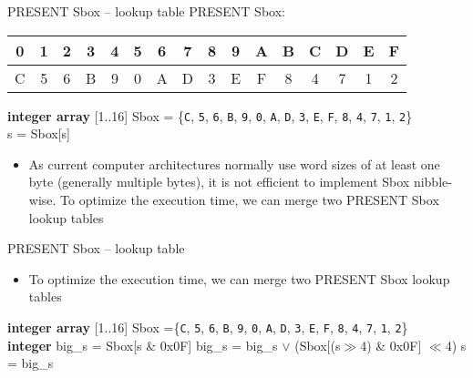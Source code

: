 \begin{frame}{PRESENT Sbox -- lookup table}
PRESENT Sbox:
\begin{table}
\centering
\ttfamily
\begin{tabular}{cccccccccccccccc}\hline
 0 & 1 & 2 & 3 & 4 & 5 & 6 & 7 & 8 & 9 & A & B & C & D & E & F \\\hline
 C & 5 & 6 & B & 9 & 0 & A & D & 3 & E & F & 8 & 4 & 7 & 1 & 2\\\hline
\end{tabular}
\end{table}
\begin{algorithm}[H]
	\textbf{integer array} [1..16] Sbox = \{\texttt{C}, \texttt{5}, \texttt{6}, \texttt{B}, \texttt{9}, \texttt{0}, \texttt{A}, \texttt{D}, \texttt{3}, \texttt{E}, \texttt{F}, \texttt{8}, \texttt{4}, \texttt{7}, \texttt{1}, \texttt{2}\}\\
 s = Sbox[s] 
 \caption{A lookup table implementation of PRESENT Sbox in pseudocode.}
\end{algorithm}
\begin{itemize}
        \item As current computer architectures normally use word sizes of at least one byte (generally multiple bytes), it is not efficient to implement Sbox nibble-wise.
To optimize the execution time, we can merge two PRESENT Sbox lookup tables
    \end{itemize}
\end{frame}

\begin{frame}{PRESENT Sbox -- lookup table}
    \begin{itemize}
        \item To optimize the execution time, we can merge two PRESENT Sbox lookup tables
    \end{itemize}
\begin{algorithm}[H]
	\textbf{integer array} [1..16] Sbox =\{\texttt{C}, \texttt{5}, \texttt{6}, \texttt{B}, \texttt{9}, \texttt{0}, \texttt{A}, \texttt{D}, \texttt{3}, \texttt{E}, \texttt{F}, \texttt{8}, \texttt{4}, \texttt{7}, \texttt{1}, \texttt{2}\}\\
 \textbf{integer} big\_s = Sbox[s \& 0x0F] 
 big\_s = big\_s $\vee$ (Sbox[(s$\gg$4) \& 0x0F] $\ll$4) 
 s = big\_s 
 \caption{A more efficient lookup table implementation of PRESENT Sbox in pseudocode.}
\end{algorithm}
\end{frame}

